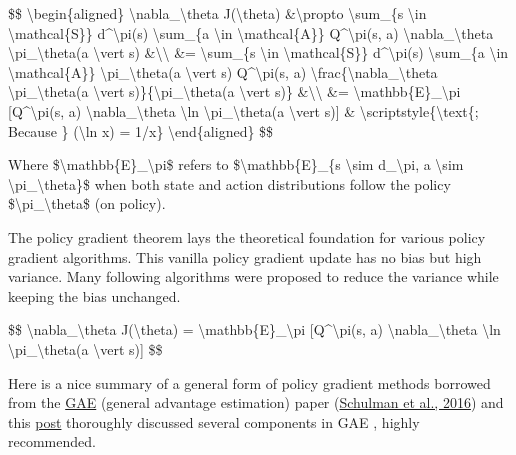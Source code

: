 \$\$ \textbackslash begin\{aligned\} \textbackslash nabla\_\textbackslash theta J(\textbackslash theta) \&\textbackslash propto \textbackslash sum\_\{s \textbackslash in \textbackslash mathcal\{S\}\} d\^{}\textbackslash pi(s) \textbackslash sum\_\{a \textbackslash in \textbackslash mathcal\{A\}\} Q\^{}\textbackslash pi(s, a) \textbackslash nabla\_\textbackslash theta \textbackslash pi\_\textbackslash theta(a \textbackslash vert s) \&\textbackslash\textbackslash{} \&= \textbackslash sum\_\{s \textbackslash in \textbackslash mathcal\{S\}\} d\^{}\textbackslash pi(s) \textbackslash sum\_\{a \textbackslash in \textbackslash mathcal\{A\}\} \textbackslash pi\_\textbackslash theta(a \textbackslash vert s) Q\^{}\textbackslash pi(s, a) \textbackslash frac\{\textbackslash nabla\_\textbackslash theta \textbackslash pi\_\textbackslash theta(a \textbackslash vert s)\}\{\textbackslash pi\_\textbackslash theta(a \textbackslash vert s)\} \&\textbackslash\textbackslash{} \&= \textbackslash mathbb\{E\}\_\textbackslash pi {[}Q\^{}\textbackslash pi(s, a) \textbackslash nabla\_\textbackslash theta \textbackslash ln \textbackslash pi\_\textbackslash theta(a \textbackslash vert s){]} \& \textbackslash scriptstyle\{\textbackslash text\{; Because \} (\textbackslash ln x)\textquotesingle{} = 1/x\} \textbackslash end\{aligned\} \$\$

Where \$\textbackslash mathbb\{E\}\_\textbackslash pi\$ refers to \$\textbackslash mathbb\{E\}\_\{s \textbackslash sim d\_\textbackslash pi, a \textbackslash sim \textbackslash pi\_\textbackslash theta\}\$ when both state and action distributions follow the policy \$\textbackslash pi\_\textbackslash theta\$ (on policy).

The policy gradient theorem lays the theoretical foundation for various policy gradient algorithms. This vanilla policy gradient update has no bias but high variance. Many following algorithms were proposed to reduce the variance while keeping the bias unchanged.

\$\$ \textbackslash nabla\_\textbackslash theta J(\textbackslash theta) = \textbackslash mathbb\{E\}\_\textbackslash pi {[}Q\^{}\textbackslash pi(s, a) \textbackslash nabla\_\textbackslash theta \textbackslash ln \textbackslash pi\_\textbackslash theta(a \textbackslash vert s){]} \$\$

Here is a nice summary of a general form of policy gradient methods borrowed from the \href{https://arxiv.org/pdf/1506.02438.pdf}{GAE} (general advantage estimation) paper (\href{https://arxiv.org/abs/1506.02438}{Schulman et al., 2016}) and this \href{https://danieltakeshi.github.io/2017/04/02/notes-on-the-generalized-advantage-estimation-paper/}{post} thoroughly discussed several components in GAE , highly recommended.


